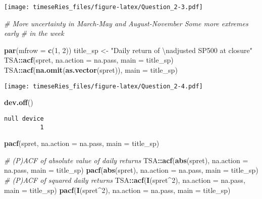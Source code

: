 \documentclass[]{book}
\newenvironment{Shaded}{\begin{snugshade}}{\end{snugshade}}
\newcommand{\KeywordTok}[1]{\textcolor[rgb]{0.13,0.29,0.53}{\textbf{#1}}}
\newcommand{\DataTypeTok}[1]{\textcolor[rgb]{0.13,0.29,0.53}{#1}}
\newcommand{\DecValTok}[1]{\textcolor[rgb]{0.00,0.00,0.81}{#1}}
\newcommand{\CharTok}[1]{\textcolor[rgb]{0.31,0.60,0.02}{#1}}
\newcommand{\StringTok}[1]{\textcolor[rgb]{0.31,0.60,0.02}{#1}}
\newcommand{\CommentTok}[1]{\textcolor[rgb]{0.56,0.35,0.01}{\textit{#1}}}
\newcommand{\OperatorTok}[1]{\textcolor[rgb]{0.81,0.36,0.00}{\textbf{#1}}}
\newcommand{\NormalTok}[1]{#1}
\begin{document}
\texttt{[image: timeseRies\_files/figure-latex/Question\_2-3.pdf]}

\begin{Shaded}
\begin{Highlighting}[]
\CommentTok{# More uncertainty in March-May and August-November Some more extremes early}
\CommentTok{# in the week}

\KeywordTok{par}\NormalTok{(}\DataTypeTok{mfrow =} \KeywordTok{c}\NormalTok{(}\DecValTok{1}\NormalTok{, }\DecValTok{2}\NormalTok{))}
\NormalTok{title_sp <-}\StringTok{ "Daily return of }\CharTok{\textbackslash{}n}\StringTok{adjusted SP500 at closure"}
\NormalTok{TSA}\OperatorTok{::}\KeywordTok{acf}\NormalTok{(spret, }\DataTypeTok{na.action =}\NormalTok{ na.pass, }\DataTypeTok{main =}\NormalTok{ title_sp)}
\NormalTok{TSA}\OperatorTok{::}\KeywordTok{acf}\NormalTok{(}\KeywordTok{na.omit}\NormalTok{(}\KeywordTok{as.vector}\NormalTok{(spret)), }\DataTypeTok{main =}\NormalTok{ title_sp)}
\end{Highlighting}
\end{Shaded}

\texttt{[image: timeseRies\_files/figure-latex/Question\_2-4.pdf]}

\begin{Shaded}
\begin{Highlighting}[]
\KeywordTok{dev.off}\NormalTok{()}
\end{Highlighting}
\end{Shaded}

\begin{verbatim}
null device 
          1 
\end{verbatim}

\begin{Shaded}
\begin{Highlighting}[]
\KeywordTok{pacf}\NormalTok{(spret, }\DataTypeTok{na.action =}\NormalTok{ na.pass, }\DataTypeTok{main =}\NormalTok{ title_sp)}

\CommentTok{# (P)ACF of absolute value of daily returns}
\NormalTok{TSA}\OperatorTok{::}\KeywordTok{acf}\NormalTok{(}\KeywordTok{abs}\NormalTok{(spret), }\DataTypeTok{na.action =}\NormalTok{ na.pass, }\DataTypeTok{main =}\NormalTok{ title_sp)}
\KeywordTok{pacf}\NormalTok{(}\KeywordTok{abs}\NormalTok{(spret), }\DataTypeTok{na.action =}\NormalTok{ na.pass, }\DataTypeTok{main =}\NormalTok{ title_sp)}
\CommentTok{# (P)ACF of squared daily returns}
\NormalTok{TSA}\OperatorTok{::}\KeywordTok{acf}\NormalTok{(}\KeywordTok{I}\NormalTok{(spret}\OperatorTok{^}\DecValTok{2}\NormalTok{), }\DataTypeTok{na.action =}\NormalTok{ na.pass, }\DataTypeTok{main =}\NormalTok{ title_sp)}
\KeywordTok{pacf}\NormalTok{(}\KeywordTok{I}\NormalTok{(spret}\OperatorTok{^}\DecValTok{2}\NormalTok{), }\DataTypeTok{na.action =}\NormalTok{ na.pass, }\DataTypeTok{main =}\NormalTok{ title_sp)}
\end{Highlighting}
\end{Shaded}
\end{document}
